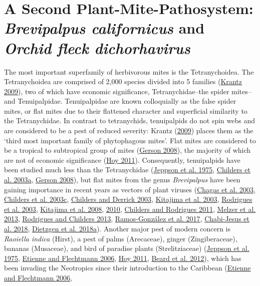 \documentclass{ufdissertation}[overrideChapters] %
\begin{document}
{\hypertarget{a-second-plant-mite-pathosystem-brevipalpus-californicus-and-orchid-fleck-dichorhavirus}{%
\section{\texorpdfstring{A Second Plant-Mite-Pathosystem: \emph{Brevipalpus californicus} and \emph{Orchid fleck dichorhavirus}}{A Second Plant-Mite-Pathosystem: Brevipalpus californicus and Orchid fleck dichorhavirus}}\label{a-second-plant-mite-pathosystem-brevipalpus-californicus-and-orchid-fleck-dichorhavirus}}

The most important superfamily of herbivorous mites is the Tetranychoidea. The Tetranychoidea are comprised of 2,000 species divided into 5 families (\protect\hyperlink{ref-Krantz2009}{Krantz 2009}), two of which have economic significance, Tetranychidae--the spider mites--and Tenuipalpidae. Tenuipalpidae are known colloquially as the false spider mites, or flat mites due to their flattened character and superficial similarity to the Tetranychidae. In contrast to tetranychids, tenuipalpids do not spin webs and are considered to be a pest of reduced severity: Krantz (\protect\hyperlink{ref-Krantz2009}{2009}) places them as the `third most important family of phytophagous mites'. Flat mites are considered to be a tropical to subtropical group of mites (\protect\hyperlink{ref-Gerson2008}{Gerson 2008}), the majority of which are not of economic significance (\protect\hyperlink{ref-Hoy2011}{Hoy 2011}). Consequently, tenuipalpids have been studied much less than the Tetranychidae (\protect\hyperlink{ref-Jeppson1975}{Jeppson et al. 1975}, \protect\hyperlink{ref-Childers2003b}{Childers et al. 2003a}, \protect\hyperlink{ref-Gerson2008}{Gerson 2008}), but flat mites from the genus \emph{Brevipalpus} have been gaining importance in recent years as vectors of plant viruses (\protect\hyperlink{ref-Chagas2003}{Chagas et al. 2003}, \protect\hyperlink{ref-Childers2003a}{Childers et al. 2003c}, \protect\hyperlink{ref-Childers2003c}{Childers and Derrick 2003}, \protect\hyperlink{ref-Kitajima2003b}{Kitajima et al. 2003}, \protect\hyperlink{ref-Rodrigues2003a}{Rodrigues et al. 2003}, \protect\hyperlink{ref-Kitajima2008}{Kitajima et al. 2008}, \protect\hyperlink{ref-Kitajima2010}{2010}, \protect\hyperlink{ref-Childers2011}{Childers and Rodrigues 2011}, \protect\hyperlink{ref-Melzer2013}{Melzer et al. 2013}, \protect\hyperlink{ref-Rodrigues2013}{Rodrigues and Childers 2013}, \protect\hyperlink{ref-RamosGonzalez2017}{Ramos-González et al. 2017}, \protect\hyperlink{ref-ChabiJesus2018}{Chabi-Jesus et al. 2018}, \protect\hyperlink{ref-Dietzgen2018}{Dietzgen et al. 2018a}). Another major pest of modern concern is \emph{Raoiella indica} (Hirst), a pest of palms (Arecaceae), ginger (Zingiberaceae), bananas (Musaceae), and bird of paradise plants (Strelitziaceae) (\protect\hyperlink{ref-Jeppson1975}{Jeppson et al. 1975}, \protect\hyperlink{ref-Etienne2006}{Etienne and Flechtmann 2006}, \protect\hyperlink{ref-Hoy2011}{Hoy 2011}, \protect\hyperlink{ref-Beard2012a}{Beard et al. 2012}), which has been invading the Neotropics since their introduction to the Caribbean (\protect\hyperlink{ref-Etienne2006}{Etienne and Flechtmann 2006}, }
\end{document}

